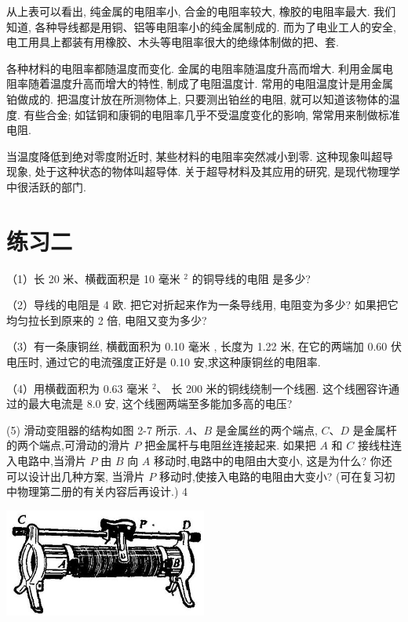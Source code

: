 \documentclass[10pt]{article}
\begin{document}
从上表可以看出, 纯金属的电阻率小, 合金的电阻率较大, 橡胶的电阻率最大. 我们知道, 各种导线都是用铜、铝等电阻率小的纯金属制成的. 而为了电业工人的安全, 电工用具上都装有用橡胶、木头等电阻率很大的绝缘体制做的把、套.

各种材料的电阻率都随温度而变化. 金属的电阻率随温度升高而增大. 利用金属电阻率随着温度升高而增大的特性, 制成了电阻温度计. 常用的电阻温度计是用金属铂做成的. 把温度计放在所测物体上, 只要测出铂丝的电阻, 就可以知道该物体的温度. 有些合金; 如锰铜和康铜的电阻率几乎不受温度变化的影响, 常常用来制做标准电阻.

当温度降低到绝对零度附近时, 某些材料的电阻率突然减小到零. 这种现象叫超导现象, 处于这种状态的物体叫超导体. 关于超导材料及其应用的研究, 是现代物理学中很活跃的部门.

\section*{练习二}

（1）长 20 米、横截面积是 10 毫米 \({}^{2}\) 的铜导线的电阻 是多少?

（2）导线的电阻是 4 欧. 把它对折起来作为一条导线用, 电阻变为多少? 如果把它均匀拉长到原来的 2 倍, 电阻又变为多少?

（3）有一条康铜丝, 横截面积为 0.10 毫米 , 长度为 1.22 米, 在它的两端加 0.60 伏电压时, 通过它的电流强度正好是 0.10 安,求这种康铜丝的电阻率.

（4）用横截面积为 0.63 毫米 \({}^{2}\text{、}\) 长 200 米的铜线绕制一个线圈. 这个线圈容许通过的最大电流是 8.0 安, 这个线圈两端至多能加多高的电压?

(5) 滑动变阻器的结构如图 2-7 所示. \(A\text{、}B\) 是金属丝的两个端点, \(C\text{、}D\) 是金属杆的两个端点,可滑动的滑片 \(P\) 把金属杆与电阻丝连接起来. 如果把 \(A\) 和 \(C\) 接线柱连入电路中,当滑片 \(P\) 由 \(B\) 向 \(A\) 移动时,电路中的电阻由大变小, 这是为什么? 你还可以设计出几种方案, 当滑片 \(P\) 移动时,使接入电路的电阻由大变小? (可在复习初中物理第二册的有关内容后再设计.) 4

\begin{center}
\includegraphics[max width=0.5\textwidth]{images/01913056-1f15-74d8-9184-9aab52c9d66b_68_273339.jpg}
\end{center}
\end{document}
